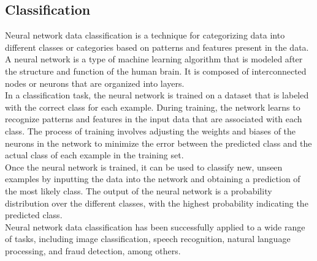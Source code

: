     \subsection{Classification} \label{subsec:clasification}
    Neural network data classification is a technique for categorizing data into different classes or categories based on patterns and features
    present in the data. A neural network is a type of machine learning algorithm that is modeled after the structure and function of the human brain.
    It is composed of interconnected nodes or neurons that are organized into layers.\\
    In a classification task, the neural network is trained on a dataset that is labeled with the correct class for each example.
    During training, the network learns to recognize patterns and features in the input data that are associated with each class.
    The process of training involves adjusting the weights and biases of the neurons in the network to minimize the error between the predicted
    class and the actual class of each example in the training set.\\
    Once the neural network is trained, it can be used to classify new, unseen examples by inputting the data into the network and
    obtaining a prediction of the most likely class. The output of the neural network is a probability distribution over the different classes,
    with the highest probability indicating the predicted class.\\
    Neural network data classification has been successfully applied to a wide range of tasks, including image classification, speech recognition,
    natural language processing, and fraud detection, among others.
